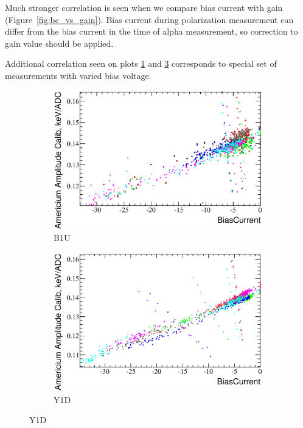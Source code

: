 \documentclass[a4paper,12pt]{article}
\begin{document}
Much stronger correlation is seen when we compare bias current with gain
(Figure~\ref{fig:bc_vs_gain}).  Bias current during polarization measurement can
differ from the bias current in the time of alpha measurement, so correction to
gain value should be applied.

Additional correlation seen on plots \ref{bc_vs_gain-b1u} and
\ref{bc_vs_gain-y1d} corresponds to special set of measurements with varied bias
voltage.


\newcommand\bcvsgainlabel{Bias current versus americium gain ($E_{\text{Am}} /
\mu_{\text{Am}}$) dependency. The colors represent different detectors.}
\begin{figure}[p]
\begin{subfigure}[b]{0.5\textwidth}
\includegraphics[width=\textwidth]{gfx/run13_alpha_study/B1U/c_hBiasCurrent_AmGain.eps}
\caption{B1U}\label{bc_vs_gain-b1u}
\end{subfigure}
\begin{subfigure}[b]{0.5\textwidth}
\includegraphics[width=\textwidth]{gfx/run13_alpha_study/Y1D/c_hBiasCurrent_AmGain.eps}
\caption{Y1D}\label{bc_vs_gain-y1d}
\end{subfigure}


\end{figure}
\end{document}
